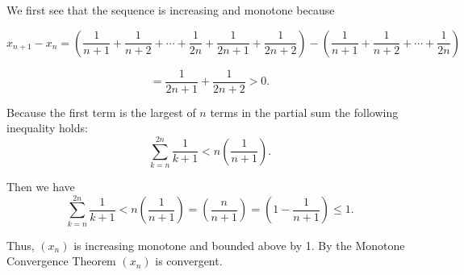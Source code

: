 \documentclass{report}
\begin{document}
\begin{myproof}

We first see that the sequence is increasing and monotone because 

$$x_{n+1} - x_{n}= 
\left(\frac{1}{n+1}+\frac{1}{n+2}+\cdots+\frac{1}{2 n} + \frac{1}{2n+1} + \frac{1}{2n+2} \right) - \left(\frac{1}{n+1}+\frac{1}{n+2}+\cdots+\frac{1}{2 n}\right)$$  

$$ = \frac{1}{2n+1} + \frac{1}{2n+2} > 0.$$



Because the first term is the largest of $n$ terms in the partial sum   the following inequality holds:
$$ \sum_{k =n}^{2n} \frac{1}{k+1} < n\left(\frac{1}{n+1}\right).$$

Then we have
$$ \sum_{k =n}^{2n} \frac{1}{k+1} < n\left(\frac{1}{n+1}\right) = \left(\frac{n}{n+1}\right) =\left(1 - \frac{1}{n + 1}\right) \leq 1.$$

Thus, $(x_n)$ is increasing monotone and bounded above by 1. By the Monotone Convergence Theorem $(x_n)$ is convergent.

\end{myproof}



\end{document}
